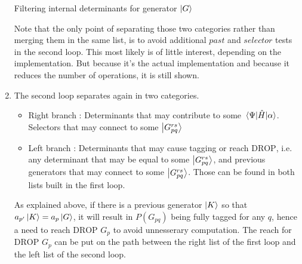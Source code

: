 \documentclass[./thesis.tex]{subfiles}
\begin{document}
\begin{enumerate}
\begin{algorithm}
\caption{Filtering internal determinants for generator $\ket G$}
\label{alg:generators_filtering}

\end{algorithm}



Note that the only point of separating those two categories rather than merging them in the same list, is to avoid additional $past$ and $selector$ tests in the second loop.
This most likely is of little interest, depending on the implementation.
But because it's the actual implementation and because it reduces the number of operations, it is still shown.

\item
The second loop separates again in two categories.

\begin{itemize}
\item
Right branch : Determinants that may contribute to some $\mel{\Psi}{\hat{H}}{\alpha}$. Selectors that may connect to some $\ket {G_{pq}^{rs}}$
\item
Left branch : Determinants that may cause tagging or reach $\text{DROP}$, i.e. any determinant that may be equal to some $\ket {G_{pq}^{rs}}$, and previous generators that may connect to some $\ket {G_{pq}^{rs}}$. Those can be found in both lists built in the first loop.
\end{itemize}

As explained above, if there is a previous generator $\ket K$ so that $a_{p'} \ket K = a_p \ket G$, it will result in $P(G_{pq})$ being fully tagged for any $q$, hence a need to reach $\text {DROP } G_p$ to avoid unnesserary computation.
The reach for $\text {DROP } G_p$ can be put on the path between the right list of the first loop and the left list of the second loop.


\end{enumerate}
\end{document}
